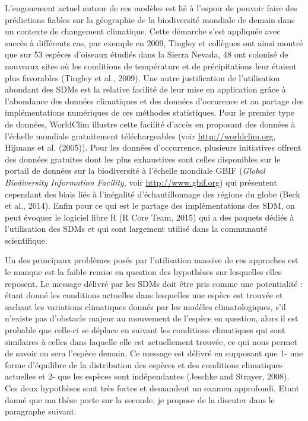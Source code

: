 L'engouement actuel autour de ces modèles est lié à l'espoir de pouvoir
faire des prédictions fiables sur la géographie de la biodiversité
mondiale de demain dans un contexte de changement climatique. Cette
démarche s'est appliquée avec succès à différents cas, par exemple en
2009, Tingley et collègues ont ainsi montré que sur 53 espèces d'oiseaux
étudiés dans la Sierra Nevada, 48 ont colonisé de nouveaux sites où les
conditions de température et de précipitations leur étaient plus
favorables (Tingley et al., 2009). Une autre justification de
l'utilisation abondant des SDMs est la relative facilité de leur mise en
application grâce à l'abondance des données climatiques et des données
d'occurence et au partage des implémentations numériques de ces méthodes
statistiques. Pour le premier type de données, WorldClim illustre cette
facilité d'accès en proposant des données à l'échelle mondiale
gratuitement téléchargeables (voir \url{http://worldclim.org}, Hijmans
et al. (2005)). Pour les données d'occurrence, plusieurs initiatives
offrent des données gratuites dont les plus exhaustives sont celles
disponibles sur le portail de données sur la biodiversité à l'échelle
mondiale GBIF (\emph{Global Biodiversity Information Facility}, voir
\url{http://www.gbif.org}) qui présentent cependant des biais liés à
l'inégalité d'échantillonnage des régions du globe (Beck et al., 2014).
Enfin pour ce qui est le partage des implémentations des SDM, on peut
évoquer le logiciel libre R (R Core Team, 2015) qui a des paquets dédiés
à l'utilisation des SDMs et qui sont largement utilisé dans la
communauté scientifique.

Un des principaux problèmes posés par l'utilisation massive de ces
approches est le manque est la faible remise en question des hypothèses
sur lesquelles elles reposent. Le message délivré par les SDMs doit être
pris comme une potentialité : étant donné les conditions actuelles dans
lesquelles une espèce est trouvée et sachant les variations climatiques
donnés par les modèles climatologiques, s'il n'existe pas d'obstacle
majeur au mouvement de l'espèce en question, alors il est probable que
celle-ci se déplace en suivant les conditions climatiques qui sont
similaires à celles dans laquelle elle est actuellement trouvée, ce qui
nous permet de savoir ou sera l'espèce demain. Ce message est délivré en
supposant que 1- une forme d'équilibre de la distribution des espèces et
des conditions climatiques actuelles et 2- que les espèces sont
indépendantes (Jeschke and Strayer, 2008). Ces deux hypothèses sont très
fortes et demandent un examen approfondi. Etant donné que ma thèse porte
sur la seconde, je propose de la discuter dans le paragraphe suivant.

